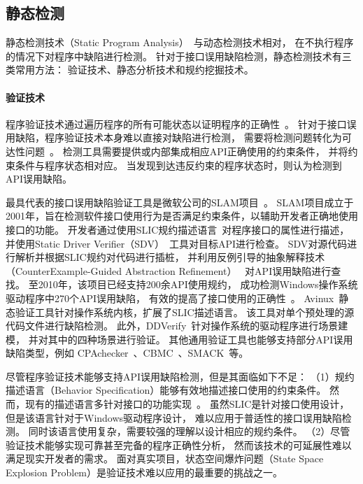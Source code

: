 \subsection{静态检测}
静态检测技术（Static Program Analysis）~\cite{08-ieee-static}与动态检测技术相对，
在不执行程序的情况下对程序中缺陷进行检测。
针对于接口误用缺陷检测，静态检测技术有三类常用方法：
验证技术、静态分析技术和规约挖掘技术。

\paragraph{验证技术}
程序验证技术通过遍历程序的所有可能状态以证明程序的正确性~\cite{08-tcad-sv}。
针对于接口误用缺陷，程序验证技术本身难以直接对缺陷进行检测，
需要将检测问题转化为可达性问题~\cite{rp}。
检测工具需要提供或内部集成相应API正确使用的约束条件，
并将约束条件与程序状态相对应。
当发现到达违反约束的程序状态时，则认为检测到API误用缺陷。

最具代表的接口误用缺陷验证工具是微软公司的SLAM项目~\cite{slam}。
SLAM项目成立于2001年，旨在检测软件接口使用行为是否满足约束条件，以辅助开发者正确地使用接口的功能。
开发者通过使用SLIC规约描述语言~\cite{01-slic}对程序接口的属性进行描述，
并使用Static Driver Verifier（SDV）~\cite{02-acm-slam}工具对目标API进行检查。
SDV对源代码进行解析并根据SLIC规约对代码进行插桩，
并利用反例引导的抽象解释技术（CounterExample-Guided Abstraction Refinement）
~\cite{00-cav-counter,02-acm-abs}对API误用缺陷进行查找。
至2010年，该项目已经支持200余API使用规约，
成功检测Windows操作系统驱动程序中270个API误用缺陷，
有效的提高了接口使用的正确性~\cite{10-cad-slam, 11-acm-slam}。
Avinux~\cite{09-avinux}静态验证工具针对操作系统内核，扩展了SLIC描述语言。
该工具对单个预处理的源代码文件进行缺陷检测。
此外，DDVerify~\cite{07-ase-ddverify}针对操作系统的驱动程序进行场景建模，
并对其中的四种场景进行验证。
其他通用验证工具也能够支持部分API误用缺陷类型，例如
CPAchecker~\cite{07-cav-cpachecker}、CBMC~\cite{14-tacas-cbmc}、SMACK~\cite{14-cav-smack}等。


尽管程序验证技术能够支持API误用缺陷检测，但是其面临如下不足：
（1）规约描述语言（Behavior Specification）能够有效地描述接口使用的约束条件。
然而，现有的描述语言多针对接口的功能实现~\cite{blast, acsl}。
虽然SLIC是针对接口使用设计，但是该语言针对于Windows驱动程序设计，
难以应用于普适性的接口误用缺陷检测。
同时该语言使用复杂，需要较强的理解以设计相应的规约条件。
（2）尽管验证技术能够实现可靠甚至完备的程序正确性分析，
然而该技术的可延展性难以满足现实开发者的需求。
面对真实项目，状态空间爆炸问题（State Space Explosion Problem）是验证技术难以应用的最重要的挑战之一。

